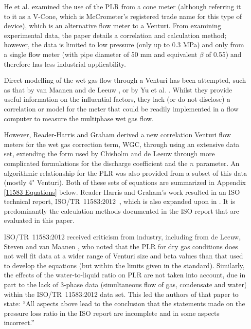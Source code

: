 \documentclass[journal]{IEEEtran}
\begin{document}
He et al. \cite{He2016} examined the use of the PLR from a cone meter (although referring it to it as a V-Cone, which is McCrometer's registered trade name for this type of device), which is an alternative flow meter to a Venturi.  From examining experimental data, the paper details a correlation and calculation method; however, the data is limited to low pressure (only up to 0.3 MPa) and only from a single flow meter (with pipe diameter of 50 mm and equivalent $\beta$ of 0.55) and therefore has less industrial applicability.

Direct modelling of the wet gas flow through a Venturi has been attempted, such as that by van Maanen and de Leeuw \cite{VanMaanen2016}, or by Yu et al. \cite{Yu2015}.  Whilst they provide useful information on the influential factors, they lack (or do not disclose) a correlation or model for the meter that could be readily implemented in a flow computer to measure the multiphase wet gas flow.

However, Reader-Harris and Graham \cite{Reader-Harris2009} derived a new correlation Venturi flow meters for the wet gas correction term, \acrshort{WGC}, through using an extensive data set, extending the form used by Chisholm \cite{Chisholm1977} and de Leeuw \cite{DeLeeuw1997} through more complicated formulations for the discharge coefficient and the $n$ parameter.  An algorithmic relationship for the \acrshort{PLR} was also provided from a subset of this data (mostly 4" Venturi).  Both of these sets of equations are summarized in Appendix \ref{11583 Equations} below. Reader-Harris and Graham's work resulted in an ISO technical report, ISO/TR~11583:2012~\cite{2003ISOTubes}, which is also expanded upon in \cite{Reader-Harris2015}.  It is predominantly the calculation methods documented in the ISO report that are evaluated in this paper.

ISO/TR~11583:2012 received criticism from industry, including from de Leeuw, Steven and van Maanen \cite{DeLeeuw2011}, who noted that the \acrlong{PLR} for dry gas conditions does not well fit data at a wider range of Venturi size and \acrshort{beta} values than that used to develop the equations (but within the limits given in the standard).  Similarly, the effects of the water-to-liquid ratio on  \acrshort{PLR} are not taken into account, due in part to the lack of 3-phase data (simultaneous flow of gas, condensate and water) within the ISO/TR~11583:2012 data set.  This led the authors of that paper to state: ``All aspects above lead to the conclusion that the statements made on the pressure loss ratio in the ISO report are incomplete and in some aspects incorrect.'' 
\end{document}
